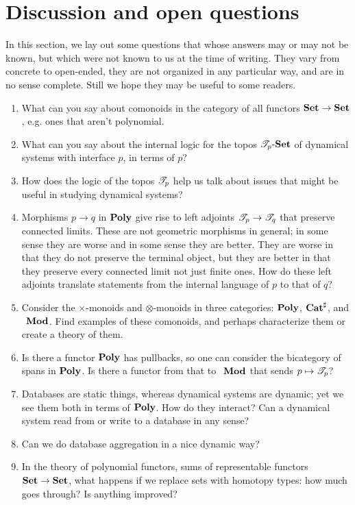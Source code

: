 \documentclass[Book-Poly]{subfiles}
\begin{document}
\section{Discussion and open questions}\label{sec.discussion_open_qs}

In this section, we lay out some questions that whose answers may or may not be known, but which were not known to us at the time of writing. They vary from concrete to open-ended, they are not organized in any particular way, and are in no sense complete. Still we hope they may be useful to some readers.

\begin{enumerate}
  \item What can you say about comonoids in the category of all functors $\mathbf{Set}\to\mathbf{Set}$, e.g. ones that aren't polynomial.
  \item What can you say about the internal logic for the topos $\mathscr{T}_{p}\textnormal{-}\mathbf{Set}$ of dynamical systems with interface $p$, in terms of $p$?
  \item How does the logic of the topos $\mathscr{T}_{p}$ help us talk about issues that might be useful in studying dynamical systems?
  \item Morphisms $p\to q$ in $\mathbf{Poly}$ give rise to left adjoints $\mathscr{T}_{p}\to\mathscr{T}_{q}$ that preserve connected limits. These are not geometric morphisms in general; in some sense they are worse and in some sense they are better. They are worse in that they do not preserve the terminal object, but they are better in that they preserve every connected limit not just finite ones. How do these left adjoints translate statements from the internal language of $p$ to that of $q$?
  \item Consider the $\times$-monoids and $\otimes$-monoids in three categories: $\mathbf{Poly}$, $\mathbf{Cat}^\sharp$, and $~_{}\mathbf{Mod}_{}$. Find examples of these comonoids, and perhaps characterize them or create a theory of them.
  \item Is there a functor $\mathbf{Poly}$ has pullbacks, so one can consider the bicategory of spans in $\mathbf{Poly}$. Is there a functor from that to $~_{}\mathbf{Mod}_{}$ that sends $p\mapsto\mathscr{T}_{p}$?
  \item Databases are static things, whereas dynamical systems are dynamic; yet we see them both in terms of $\mathbf{Poly}$. How do they interact? Can a dynamical system read from or write to a database in any sense?
  \item Can we do database aggregation in a nice dynamic way?
  \item In the theory of polynomial functors, sums of representable functors $\mathbf{Set}\to\mathbf{Set}$, what happens if we replace sets with homotopy types: how much goes through? Is anything improved?

\end{enumerate}
\end{document}
